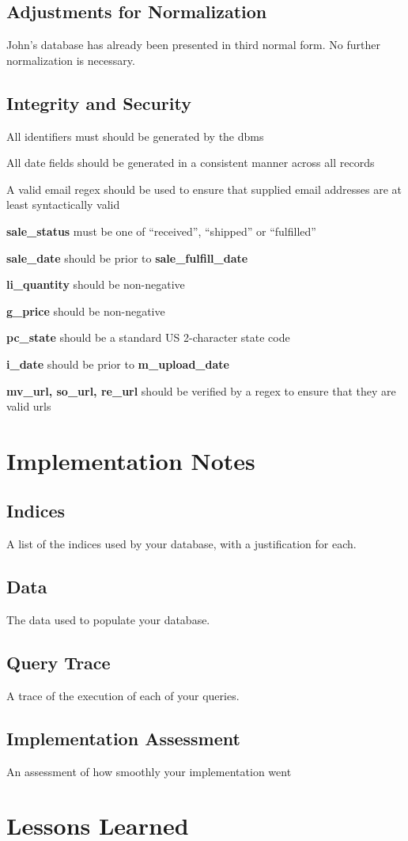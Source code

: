 \documentclass[11pt, a4paper]{report}
\begin{document}
\section{Adjustments for Normalization}
John's database has already been presented in third normal form. No further normalization is necessary.


\section{Integrity and Security}
\begin{itemize*}
    \item All identifiers must should be generated by the dbms
    \item All date fields should be generated in a consistent manner across all records
    \item A valid email regex should be used to ensure that supplied email addresses are at least syntactically valid
    \item \textbf{sale\_status} must be one of ``received'', ``shipped'' or ``fulfilled''
    \item \textbf{sale\_date} should be prior to \textbf{sale\_fulfill\_date}
    \item \textbf{li\_quantity} should be non-negative
    \item \textbf{g\_price} should be non-negative
    \item \textbf{pc\_state} should be a standard US 2-character state code
    \item \textbf{i\_date} should be prior to \textbf{m\_upload\_date}
    \item \textbf{mv\_url, so\_url, re\_url} should be verified by a regex to ensure that they are valid urls
  \end{itemize*}


\chapter{Implementation Notes}
\section{Indices}
    A list of the indices used by your database, with a justification for each.
\section{Data}
    The data used to populate your database.
\section{Query Trace}
    A trace of the execution of each of your queries.
\section{Implementation Assessment}
    An assessment of how smoothly your implementation went

\chapter{Lessons Learned}
\end{document}
